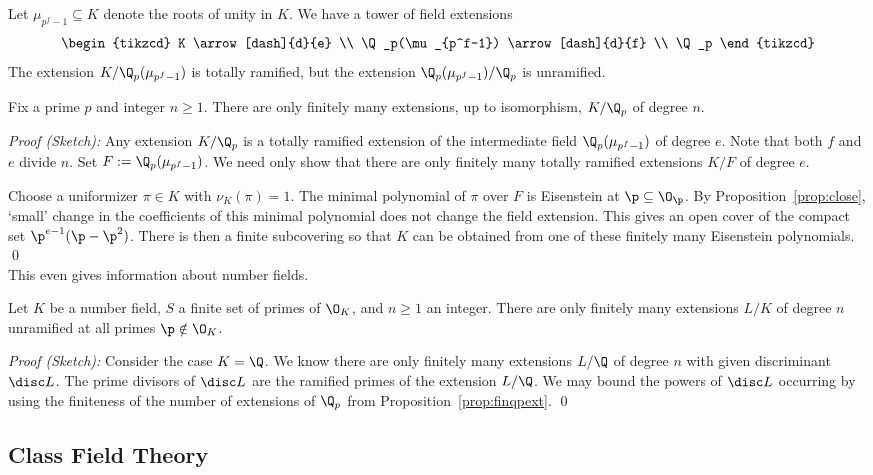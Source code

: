 Let $\mu_{p^f-1} \subseteq K$ denote the roots of unity in $K$. We have a tower of field extensions
	\[
	\begin{tikzcd}
	K \arrow[dash]{d}{e} \\
	\Q_p(\mu_{p^f-1}) \arrow[dash]{d}{f} \\
	\Q_p
	\end{tikzcd}
	\]
The extension $K/\Q_p(\mu_{p^f-1})$ is totally ramified, but the extension $\Q_p(\mu_{p^f-1})/\Q_p$ is unramified. 

\begin{prop}\label{prop:finqpext}
Fix a prime $p$ and integer $n \geq 1$. There are only finitely many extensions, up to isomorphism, $K/\Q_p$ of degree $n$.
\end{prop}

\noindent \emph{Proof (Sketch): } Any extension $K/\Q_p$ is a totally ramified extension of the intermediate field $\Q_p(\mu_{p^f-1})$ of degree $e$. Note that both $f$ and $e$ divide $n$. Set $F:= \Q_p(\mu_{p^f-1})$. We need only show that there are only finitely many totally ramified extensions $K/F$ of degree $e$.

Choose a uniformizer $\pi \in K$ with $\nu_K(\pi)=1$. The minimal polynomial of $\pi$ over $F$ is Eisenstein at $\p \subseteq \O_\p$. By Proposition~\ref{prop:close}, `small' change in the coefficients of this minimal polynomial does not change the field extension. This gives an open cover of the compact set $\p^{e-1}(\p - \p^2)$. There is then a finite subcovering so that $K$ can be obtained from one of these finitely many Eisenstein polynomials. \qed \\

This even gives information about number fields.

\begin{thm}
Let $K$ be a number field, $S$ a finite set of primes of $\O_K$, and $n \geq 1$ an integer. There are only finitely many extensions $L/K$ of degree $n$ unramified at all primes $\p \notin \O_K$. 
\end{thm}

\noindent \emph{Proof (Sketch): } Consider the case $K=\Q$. We know there are only finitely many extensions $L/\Q$ of degree $n$ with given discriminant $\disc L$. The prime divisors of $\disc L$ are the ramified primes of the extension $L/\Q$. We may bound the powers of $\disc L$ occurring by using the finiteness of the number of extensions of $\Q_p$ from Proposition~\ref{prop:finqpext}. \qed \\





\subsection{Class Field Theory} 

































